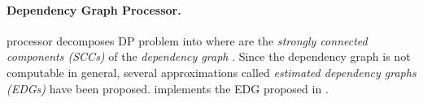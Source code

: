\documentclass{llncs}
\newif\iffullversion
\begin{document}
\iffullversion
\def\myparagraph#1{\subsection{#1}}
\else
\def\myparagraph#1{\paragraph*{\bf#1.}}
\fi

\myparagraph{Dependency Graph Processor}
 processor decomposes
	DP problem  into 
	where  are the
	\emph{strongly connected components (SCCs)} of the
	\emph{dependency graph} \cite{HM04,GTS04}.
	Since the dependency graph is not computable in general,
	several approximations called
	\emph{estimated dependency graphs (EDGs)} have been proposed.
	\NaTT implements the EDG proposed in \cite{GTS05}.
\end{document}
